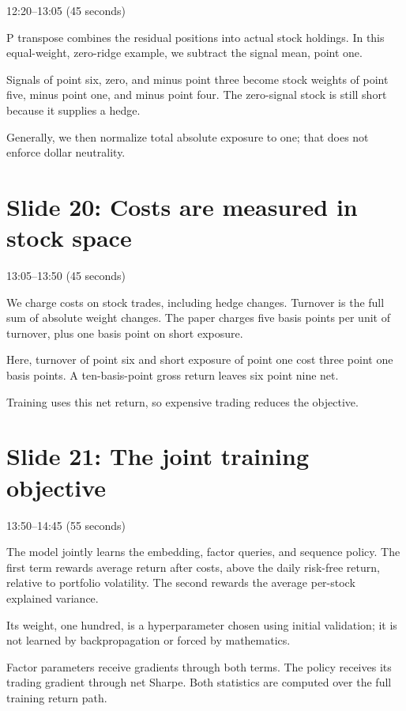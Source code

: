 \documentclass[11pt]{article}
\begin{document}
\textcolor{SBred}{12:20--13:05 (45 seconds)}

P transpose combines the residual positions into actual stock holdings. In this equal-weight, zero-ridge example, we subtract the signal mean, point one.

Signals of point six, zero, and minus point three become stock weights of point five, minus point one, and minus point four. The zero-signal stock is still short because it supplies a hedge.

Generally, we then normalize total absolute exposure to one; that does not enforce dollar neutrality.

\section*{Slide 20: Costs are measured in stock space}

\textcolor{SBred}{13:05--13:50 (45 seconds)}

We charge costs on stock trades, including hedge changes. Turnover is the full sum of absolute weight changes. The paper charges five basis points per unit of turnover, plus one basis point on short exposure.

Here, turnover of point six and short exposure of point one cost three point one basis points. A ten-basis-point gross return leaves six point nine net.

Training uses this net return, so expensive trading reduces the objective.

\section*{Slide 21: The joint training objective}

\textcolor{SBred}{13:50--14:45 (55 seconds)}

The model jointly learns the embedding, factor queries, and sequence policy. The first term rewards average return after costs, above the daily risk-free return, relative to portfolio volatility. The second rewards the average per-stock explained variance.

Its weight, one hundred, is a hyperparameter chosen using initial validation; it is not learned by backpropagation or forced by mathematics.

Factor parameters receive gradients through both terms. The policy receives its trading gradient through net Sharpe. Both statistics are computed over the full training return path.
\end{document}
